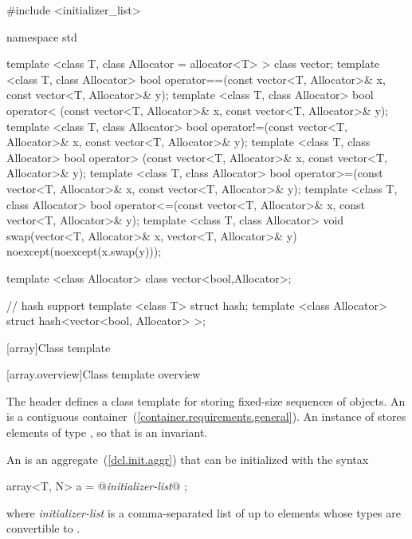 %

\begin{codeblock}
#include <initializer_list>

namespace std {
  template <class T, class Allocator = allocator<T> > class vector;
  template <class T, class Allocator>
    bool operator==(const vector<T, Allocator>& x, const vector<T, Allocator>& y);
  template <class T, class Allocator>
    bool operator< (const vector<T, Allocator>& x, const vector<T, Allocator>& y);
  template <class T, class Allocator>
    bool operator!=(const vector<T, Allocator>& x, const vector<T, Allocator>& y);
  template <class T, class Allocator>
    bool operator> (const vector<T, Allocator>& x, const vector<T, Allocator>& y);
  template <class T, class Allocator>
    bool operator>=(const vector<T, Allocator>& x, const vector<T, Allocator>& y);
  template <class T, class Allocator>
    bool operator<=(const vector<T, Allocator>& x, const vector<T, Allocator>& y);
  template <class T, class Allocator>
    void swap(vector<T, Allocator>& x, vector<T, Allocator>& y)
      noexcept(noexcept(x.swap(y)));

  template <class Allocator> class vector<bool,Allocator>;

  // hash support
  template <class T> struct hash;
  template <class Allocator> struct hash<vector<bool, Allocator> >;
}
\end{codeblock}

[array]{Class template }
%

[array.overview]{Class template  overview}

\pnum
{}%
The header  defines a class template for storing fixed-size
sequences of objects.
An  is a contiguous container~(\ref{container.requirements.general}).
An instance of  stores  elements of type ,
so that  is an invariant.

\pnum
{}%
%
An  is an aggregate~(\ref{dcl.init.aggr}) that can be
initialized with the syntax
\begin{codeblock}
array<T, N> a = { @\textit{initializer-list}@ };
\end{codeblock}

where \textit{initializer-list} is a comma-separated list of up
to  elements whose types are convertible to .

